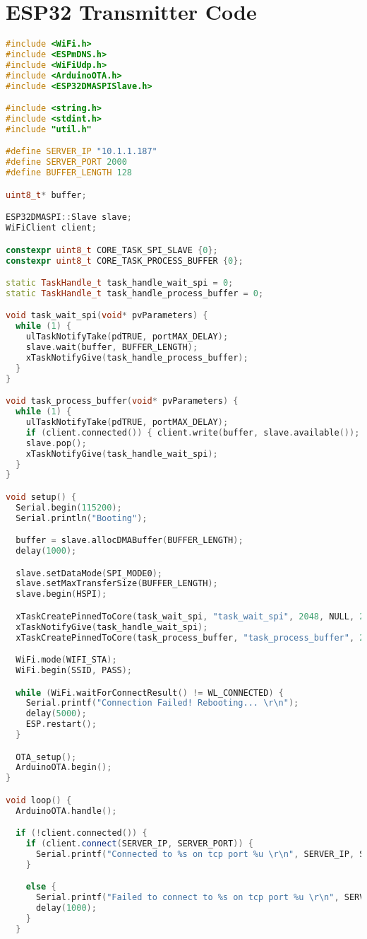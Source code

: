 \chapter{ESP32 Transmitter Code}\label{appendix:esp_code}

\begin{lstlisting}[language=C++]
#include <WiFi.h>
#include <ESPmDNS.h>
#include <WiFiUdp.h>
#include <ArduinoOTA.h>
#include <ESP32DMASPISlave.h>

#include <string.h>
#include <stdint.h>
#include "util.h"

#define SERVER_IP "10.1.1.187"
#define SERVER_PORT 2000
#define BUFFER_LENGTH 128

uint8_t* buffer;

ESP32DMASPI::Slave slave;
WiFiClient client;

constexpr uint8_t CORE_TASK_SPI_SLAVE {0};
constexpr uint8_t CORE_TASK_PROCESS_BUFFER {0};

static TaskHandle_t task_handle_wait_spi = 0;
static TaskHandle_t task_handle_process_buffer = 0;

void task_wait_spi(void* pvParameters) {
  while (1) {
    ulTaskNotifyTake(pdTRUE, portMAX_DELAY);
    slave.wait(buffer, BUFFER_LENGTH);
    xTaskNotifyGive(task_handle_process_buffer);
  }
}

void task_process_buffer(void* pvParameters) {
  while (1) {
    ulTaskNotifyTake(pdTRUE, portMAX_DELAY);
    if (client.connected()) { client.write(buffer, slave.available()); }
    slave.pop();
    xTaskNotifyGive(task_handle_wait_spi);
  }
}

void setup() {
  Serial.begin(115200);
  Serial.println("Booting");

  buffer = slave.allocDMABuffer(BUFFER_LENGTH);
  delay(1000);

  slave.setDataMode(SPI_MODE0);
  slave.setMaxTransferSize(BUFFER_LENGTH);
  slave.begin(HSPI);

  xTaskCreatePinnedToCore(task_wait_spi, "task_wait_spi", 2048, NULL, 2, &task_handle_wait_spi, CORE_TASK_SPI_SLAVE);
  xTaskNotifyGive(task_handle_wait_spi);
  xTaskCreatePinnedToCore(task_process_buffer, "task_process_buffer", 2048, NULL, 2, &task_handle_process_buffer, CORE_TASK_PROCESS_BUFFER);

  WiFi.mode(WIFI_STA);
  WiFi.begin(SSID, PASS);

  while (WiFi.waitForConnectResult() != WL_CONNECTED) {
    Serial.printf("Connection Failed! Rebooting... \r\n");
    delay(5000);
    ESP.restart();
  }

  OTA_setup();
  ArduinoOTA.begin();
}

void loop() {
  ArduinoOTA.handle();

  if (!client.connected()) {
    if (client.connect(SERVER_IP, SERVER_PORT)) {
      Serial.printf("Connected to %s on tcp port %u \r\n", SERVER_IP, SERVER_PORT);
    }

    else {
      Serial.printf("Failed to connect to %s on tcp port %u \r\n", SERVER_IP, SERVER_PORT);
      delay(1000);
    }
  }

\end{lstlisting}
